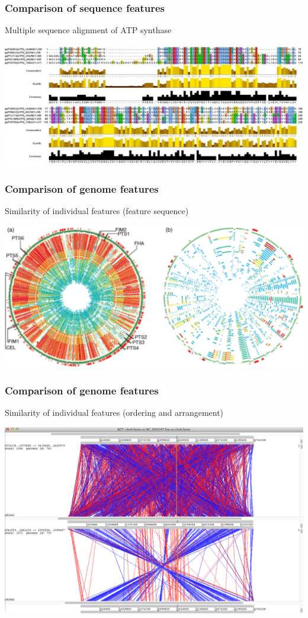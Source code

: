 %
\begin{frame}
  \frametitle{Comparison of sequence features}
  Multiple sequence alignment of ATP synthase \\
  \begin{center}
    \includegraphics[width=\textwidth]{images/atp_synthase_alignment}
  \end{center}  
\end{frame}

%
\begin{frame}
  \frametitle{Comparison of genome features}
  Similarity of individual features (feature sequence) \\
  \begin{center}
    \includegraphics[width=\textwidth]{images/salmonella_circular_comparison}
  \end{center}  
\end{frame}

%
\begin{frame}
  \frametitle{Comparison of genome features}
  Similarity of individual features (ordering and arrangement) \\
  \begin{center}
    \includegraphics[width=\textwidth]{images/act_rearrangement}
  \end{center}  
\end{frame}

